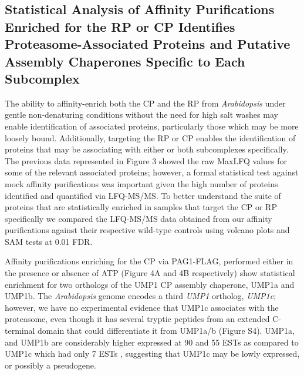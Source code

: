 \subsection{Statistical Analysis of Affinity Purifications Enriched for the RP or CP Identifies Proteasome-Associated Proteins and Putative Assembly Chaperones Specific to Each Subcomplex}
	The ability to affinity-enrich both the CP and the RP from \textit{Arabidopsis} under gentle non-denaturing conditions without the need for high salt washes may enable identification of associated proteins, particularly those which may be more loosely bound. Additionally, targeting the RP or CP enables the identification of proteins that may be associating with either or both subcomplexes specifically. The previous data represented in Figure 3 showed the raw MaxLFQ values for some of the relevant associated proteins; however, a formal statistical test against mock affinity purifications was important given the high number of proteins identified and quantified via LFQ-MS/MS. To better understand the suite of proteins that are statistically enriched in samples that target the CP or RP specifically we compared the LFQ-MS/MS data obtained from our affinity purifications against their respective wild-type controls using volcano plots and SAM tests at 0.01 FDR.
	
Affinity purifications enriching for the CP via PAG1-FLAG, performed either in the presence or absence of ATP (Figure 4A and 4B respectively) show statistical enrichment for two orthologs of the UMP1 CP assembly chaperone, UMP1a and UMP1b. The \textit{Arabidopsis} genome encodes a third \textit{UMP1} ortholog, \textit{UMP1c}; however, we have no experimental evidence that UMP1c associates with the proteasome, even though it has several tryptic peptides from an extended C-terminal domain that could differentiate it from UMP1a/b (Figure S4). UMP1a, and UMP1b are considerably higher expressed at 90 and 55 ESTs as compared to UMP1c which had only 7 ESTs \citep{berardini15}, suggesting that UMP1c may be lowly expressed, or possibly a pseudogene. 

